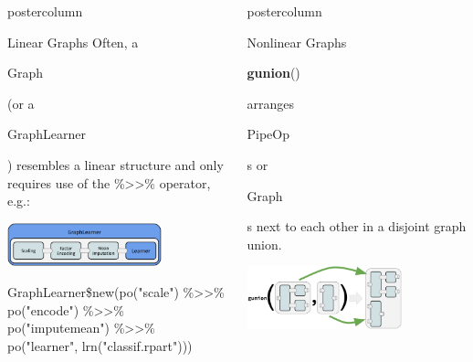 \documentclass{beamer}
\newlength{\columnheight} %
\newcommand{\codeinline}[1]{\begin{codeboxinline}#1\end{codeboxinline}}
\begin{document}
\begin{frame}[fragile]{}
\begin{columns}
\begin{column}{.245\textwidth}
\begin{beamercolorbox}[center]{postercolumn}
\begin{minipage}{.98\textwidth}
{            \begin{myblock}{Linear Graphs}
              Often, a \codeinline{Graph} (or a \codeinline{GraphLearner}) resembles a linear structure and only requires use of the \%>{}>\% operator, e.g.:
              \begin{center}
                \includegraphics[width=0.7\textwidth]{img/grl_linear.pdf}
              \end{center}
              \begin{codeboxmultiline}[width=27cm]
                GraphLearner\$new(po("scale") \%>{}>\%\\
                \hspace*{1ex} po("encode") \%>{}>\% po("imputemean") \%>{}>\% \\
                \hspace*{1ex} po("learner", lrn("classif.rpart")))
              \end{codeboxmultiline}
            \end{myblock}
						\vfill}
				\end{minipage}
			\end{beamercolorbox}
		\end{column}
		\begin{column}{.245\textwidth}
			\begin{beamercolorbox}[center]{postercolumn}
				\begin{minipage}{.98\textwidth}
					\parbox[t][\columnheight]{\textwidth}{
            \begin{myblock}{Nonlinear Graphs}
              \codeinline{\textbf{gunion}()} arranges \codeinline{PipeOp}s or \codeinline{Graph}s next to each other in a disjoint graph union.
              \begin{center}
                \includegraphics[width=0.7\textwidth]{img/gunion.pdf}

\end{center}
\end{myblock}}
\end{minipage}
\end{beamercolorbox}
\end{column}
\end{columns}
\end{frame}
\end{document}
